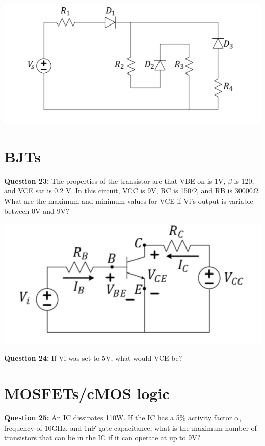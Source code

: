 \documentclass{article}
\begin{document}
\begin{center}
    \includegraphics[width=0.75\linewidth]{figures/46.png}
\end{center}

\pagebreak

\section*{BJTs}
\textbf{Question 23:} The properties of the transistor are that VBE on is 1V, \(\beta\) is 120, and VCE sat is 0.2 V. In this circuit, VCC is 9V, RC is 150\(\Omega\), and RB is 30000\(\Omega\). What are the maximum and minimum values for VCE if Vi’s output is variable between 0V and 9V?

\begin{center}

    \includegraphics[width=0.75\linewidth]{figures/56.png}
\end{center}


\textbf{Question 24:} If Vi was set to 5V, what would VCE be?


\section*{MOSFETs/cMOS logic}
\textbf{Question 25:} An IC dissipates 110W. If the IC has a 5\% activity factor \(\alpha\), frequency of 10GHz, and 1nF gate capacitance, what is the maximum number of transistors that can be in the IC if it can operate at up to 9V?
\end{document}
